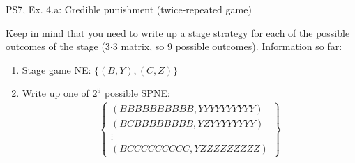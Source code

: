 \begin{frame}{PS7, Ex. 4.a: Credible punishment (twice-repeated game)}
\begin{multicols}{2}
      Keep in mind that you need to write up a  stage strategy for each of the possible outcomes of the  stage (3$\cdot$3 matrix, so 9 possible outcomes).
        \vfill\null\columnbreak
        Information so far:
        \begin{enumerate}
          \item Stage game NE: $\{(B,Y),(C,Z)\}$
          \item Write up one of $2^9$ possible SPNE:
          \begin{align*}\left\{
              \begin{array}{c}
                (BBBBBBBBBB,YYYYYYYYYY)\\
                (BCBBBBBBBB,YZYYYYYYYY)\\
                \vdots\\
                (BCCCCCCCCC,YZZZZZZZZZ)
              \end{array}\right\}
          \end{align*}
        \end{enumerate}
        \vfill\null
    \end{multicols}
\end{frame}

